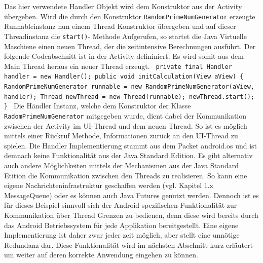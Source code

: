 \documentclass[12pt,oneside,a4paper,bibtotoc,liststotoc]{scrreprt}
\begin{document}
Das hier verwendete Handler Objekt wird dem Konstruktor aus der Activity übergeben. Wird die durch den Konstruktor \texttt{RandomPrimeNumGenerator} erzeugte Runnableinstanz nun einem Thread Konstruktor übergeben und auf dieser Threadinstanz die \texttt{start()}- Methode Aufgerufen, so startet die Java Virtuelle Maschiene einen neuen Thread, der die zeitintensive Berechnungen ausführt. Der folgende Codeabschnitt ist in der Activity defininiert. Es wird somit aus dem Main Thread heraus ein neuer Thread erzeugt.\newline\newline\newline
\texttt{
private final Handler handler = new Handler();\newline\newline
public void initCalculation(View aView)\newline
  \{ \newline
     RandomPrimeNumGenerator runnable =
        new RandomPrimeNumGenerator(aView, handler);\newline\newline  
     Thread newThread = new Thread(runnable);\newline
     newThread.start();\newline
  \} \newline
} \newline
Die Händler Instanz, welche dem Konstruktor der Klasse \texttt{RadomPrimeNumGenerator} mitgegeben wurde, dient dabei der Kommunikation zwischen der Activity im UI-Thread und dem neuen Thread. So ist es möglich mittels einer Rückruf Methode, Informationen zurück an den UI-Thread zu spielen. Die Handler Implementierung stammt aus dem Packet android.os und ist demnach keine Funktionalität aus der Java Standard Edition. Es gibt alternativ auch andere Möglichkeiten mittels der Mechanismen aus der Java Standard Etition die Kommunikation zwischen den Threads zu realisieren. So kann eine eigene Nachrichteninfrastruktur geschaffen werden (vgl. Kapitel 1.x MessageQueue) oder es können auch Java Futures genutzt werden. Dennoch ist es für dieses Beispiel sinnvoll sich der Android-spezifischen Funktionalität zur Kommunikation über Thread Grenzen zu bedienen, denn diese wird bereits durch das Android Betriebssystem für jede Applikation bereitgestellt. Eine eigene Implementierung ist daher zwar jeder zeit möglich, aber stellt eine unnötige Redundanz dar. Diese Funktionalität wird im nächsten Abschnitt kurz erläutert um weiter auf deren korrekte Anwendung eingehen zu können.
\end{document}
